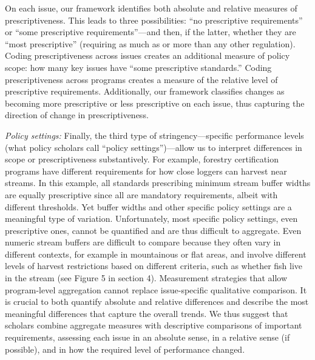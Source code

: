 \documentclass[
      12pt,
            Review ]{article}
\begin{document}
On each issue, our framework identifies both absolute and relative
measures of prescriptiveness. This leads to three possibilities: ``no
prescriptive requirements'' or ``some prescriptive requirements''---and
then, if the latter, whether they are ``most prescriptive'' (requiring
as much as or more than any other regulation). Coding prescriptiveness
across issues creates an additional measure of policy scope: how many
key issues have ``some prescriptive standards.'' Coding prescriptiveness
across programs creates a measure of the relative level of prescriptive
requirements. Additionally, our framework classifies changes as becoming
more prescriptive or less prescriptive on each issue, thus capturing the
direction of change in prescriptiveness.



\emph{Policy settings:} Finally, the third type of stringency---specific
performance levels (what policy scholars call ``policy
settings'')---allow us to interpret differences in scope or
prescriptiveness substantively. For example, forestry certification
programs have different requirements for how close loggers can harvest
near streams. In this example, all standards prescribing minimum stream
buffer widths are equally prescriptive since all are mandatory
requirements, albeit with different thresholds. Yet buffer widths and
other specific policy settings are a meaningful type of variation.
Unfortunately, most specific policy settings, even prescriptive ones,
cannot be quantified and are thus difficult to aggregate. Even numeric
stream buffers are difficult to compare because they often vary in
different contexts, for example in mountainous or flat areas, and
involve different levels of harvest restrictions based on different
criteria, such as whether fish live in the stream (see Figure 5 in
section 4). Measurement strategies that allow program-level aggregation
cannot replace issue-specific qualitative comparison. It is crucial to
both quantify absolute and relative differences and describe the most
meaningful differences that capture the overall trends. We thus suggest
that scholars combine aggregate measures with descriptive comparisons of
important requirements, assessing each issue in an absolute sense, in a
relative sense (if possible), and in how the required level of
performance changed.
\end{document}
